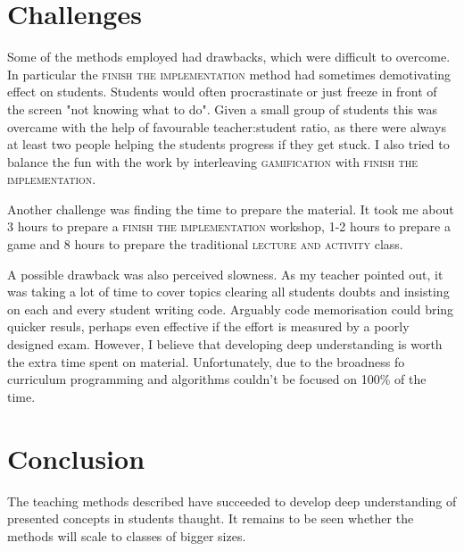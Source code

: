 \documentclass[12pt]{article}
\begin{document}
\section{Challenges}
Some of the methods employed had drawbacks, which were difficult to overcome. In particular the \textsc{finish the implementation} method had sometimes demotivating effect on students. Students would often procrastinate or just freeze in front of the screen "not knowing what to do". Given a small group of students this was overcame with the help of favourable teacher:student ratio, as there were always at least two people helping the students progress if they get stuck. I also tried to balance the fun with the work by interleaving \textsc{gamification} with \textsc{finish the implementation}.

Another challenge was finding the time to prepare the material. It took me about 3 hours to prepare a \textsc{finish the implementation} workshop, 1-2 hours to prepare a game and 8 hours to prepare the traditional \textsc{lecture and activity} class.

A possible drawback was also perceived slowness. As my teacher pointed out, it was taking a lot of time to cover topics clearing all students doubts and insisting on each and every student writing code. Arguably code memorisation could bring quicker resuls, perhaps even effective if the effort is measured by a poorly designed exam. However, I believe that developing deep understanding is worth the extra time spent on material. Unfortunately, due to the broadness fo curriculum programming and algorithms couldn't be focused on 100\% of the time.

\section{Conclusion}
The teaching methods described have succeeded to develop deep understanding of presented concepts in students thaught. It remains to be seen whether the methods will scale to classes of bigger sizes.

\printbibliography
\end{document}
